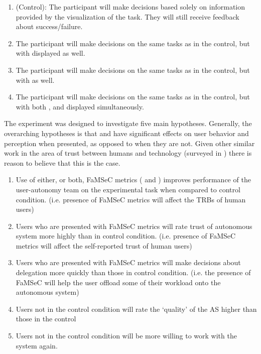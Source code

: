     \begin{enumerate}[label=\textbf{C\arabic*}]
        \item (Control): The participant will make decisions based solely on information provided by the visualization of the task. They will still receive feedback about success/failure. \label{itm:C1}
        \item The participant will make decisions on the same tasks as in the control, but with \xQ{} displayed as well.\label{itm:C2}
        \item The participant will make decisions on the same tasks as in the control, but with \xO{} as well. \label{itm:C3}
        \item The participant will make decisions on the same tasks as in the control, but with both \xQ{}, and \xO{} displayed simultaneously. \label{itm:C4}
    \end{enumerate}

    The experiment was designed to investigate five main hypotheses. Generally, the overarching hypotheses is that \xQ{} and \xO{} have significant effects on user behavior and perception when presented, as opposed to when they are not. Given other similar work in the area of trust between humans and technology (surveyed in \cite{Israelsen2017-ym}) there is reason to believe that this is the case.

    \begin{enumerate}[label=\textbf{H\arabic*}]
        \item Use of either, or both, FaMSeC metrics (\xQ{} and \xO{}) improves performance of the user-autonomy team on the experimental task when compared to control condition. (i.e. presence of FaMSeC metrics will affect the TRBs of human users) \label{itm:H1}
        \item Users who are presented with FaMSeC metrics will rate trust of autonomous system more highly than in control condition. (i.e. presence of FaMSeC metrics will affect the self-reported trust of human users) \label{itm:H2}
        \item Users who are presented with FaMSeC metrics will make decisions about delegation more quickly than those in control condition. (i.e. the presence of FaMSeC will help the user offload some of their workload onto the autonomous system) \label{itm:H3}
        \item Users not in the control condition will rate the ‘quality’ of the AS higher than those in the control \label{itm:H4}
        \item Users not in the control condition will be more willing to work with the system again. \label{itm:H5}
    \end{enumerate}

